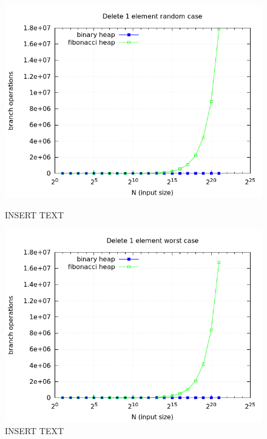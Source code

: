 \documentclass[a4paper,oneside,article,11pt]{memoir}
\begin{document}
\begin{figure}[H]
\centering
\begin{minipage}{0.48\columnwidth}
  \centering
  \includegraphics[width=\linewidth]{../res/delmin/delmin_del_1_branch_random.png}%
  \caption{INSERT TEXT}
  \label{fig:delmin_1_random_branch}
\end{minipage}%
\hfill
\begin{minipage}{0.48\columnwidth}
  \centering
  \includegraphics[width=\linewidth]{../res/delmin/delmin_del_1_branch_worst.png}%
  \caption{INSERT TEXT}
  \label{fig:delmin_1_worst_branch}
\end{minipage}
\end{figure}
\end{document}

